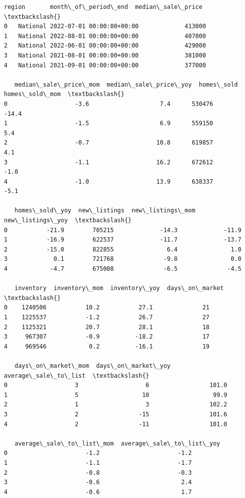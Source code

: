 \documentclass[11pt]{article}
\makeatletter
\newcommand{\boxspacing}{\kern\kvtcb@left@rule\kern\kvtcb@boxsep}
\newcommand{\prompt}[4]{
        {\ttfamily\llap{{\color{#2}[#3]:\hspace{3pt}#4}}\vspace{-\baselineskip}}
    }
\makeatother
\begin{document}
            \begin{tcolorbox}[breakable, size=fbox, boxrule=.5pt, pad at break*=1mm, opacityfill=0]
\prompt{Out}{outcolor}{3}{\boxspacing}
\begin{Verbatim}[commandchars=\\\{\}]
      region       month\_of\_period\_end  median\_sale\_price  \textbackslash{}
0   National 2022-07-01 00:00:00+00:00             413000
1   National 2022-08-01 00:00:00+00:00             407000
2   National 2022-06-01 00:00:00+00:00             429000
3   National 2021-08-01 00:00:00+00:00             381000
4   National 2021-09-01 00:00:00+00:00             377000

   median\_sale\_price\_mom  median\_sale\_price\_yoy  homes\_sold  homes\_sold\_mom  \textbackslash{}
0                   -3.6                    7.4      530476           -14.4
1                   -1.5                    6.9      559150             5.4
2                   -0.7                   10.8      619857             4.1
3                   -1.1                   16.2      672612            -1.0
4                   -1.0                   13.9      638337            -5.1

   homes\_sold\_yoy  new\_listings  new\_listings\_mom  new\_listings\_yoy  \textbackslash{}
0           -21.9        705215             -14.3             -11.9
1           -16.9        622537             -11.7             -13.7
2           -15.0        822855               6.4               1.0
3             0.1        721768              -9.8               0.0
4            -4.7        675008              -6.5              -4.5

   inventory  inventory\_mom  inventory\_yoy  days\_on\_market  \textbackslash{}
0    1240506           10.2           27.1              21
1    1225537           -1.2           26.7              27
2    1125321           20.7           28.1              18
3     967307           -0.9          -18.2              17
4     969546            0.2          -16.1              19

   days\_on\_market\_mom  days\_on\_market\_yoy  average\_sale\_to\_list  \textbackslash{}
0                   3                   6                 101.0
1                   5                  10                  99.9
2                   1                   3                 102.2
3                   2                 -15                 101.6
4                   2                 -11                 101.0

   average\_sale\_to\_list\_mom  average\_sale\_to\_list\_yoy
0                      -1.2                      -1.2
1                      -1.1                      -1.7
2                      -0.8                      -0.3
3                      -0.6                       2.4
4                      -0.6                       1.7
\end{Verbatim}
\end{tcolorbox}
        
\end{document}
